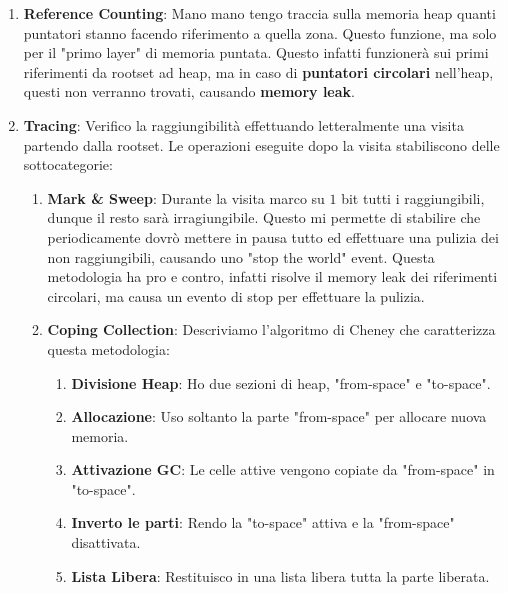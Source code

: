 \documentclass{article}
\begin{document}
\begin{enumerate}
    \item \textbf{Reference Counting}: Mano mano tengo traccia sulla memoria heap quanti puntatori stanno facendo riferimento a quella zona. Questo funzione, ma solo per il "primo layer" di memoria puntata. Questo infatti funzionerà sui primi riferimenti da rootset ad heap, ma in caso di \textbf{puntatori circolari} nell'heap, questi non verranno trovati, causando \textbf{memory leak}.
    \vspace*{10px}
    \item \textbf{Tracing}: Verifico la raggiungibilità effettuando letteralmente una visita partendo dalla rootset. Le operazioni eseguite dopo la visita stabiliscono delle sottocategorie:
    \begin{enumerate}
        \item \textbf{Mark \& Sweep}: Durante la visita marco su $1$ bit tutti i raggiungibili, dunque il resto sarà irragiungibile. Questo mi permette di stabilire che periodicamente dovrò mettere in pausa tutto ed effettuare una pulizia dei non raggiungibili, causando uno "stop the world" event.
        Questa metodologia ha pro e contro, infatti risolve il memory leak dei riferimenti circolari, ma causa un evento di stop per effettuare la pulizia.
        \item \textbf{Coping Collection}: Descriviamo l'algoritmo di Cheney che caratterizza questa metodologia:
        \begin{enumerate}
            \vspace*{8px}
            \item \textbf{Divisione Heap}: Ho due sezioni di heap, "from-space" e "to-space".
            \vspace*{8px}
            \item \textbf{Allocazione}: Uso soltanto la parte "from-space" per allocare nuova memoria.
            \vspace*{8px}
            \item \textbf{Attivazione GC}: Le celle attive vengono copiate da "from-space" in "to-space".
            \vspace*{8px}
            \item \textbf{Inverto le parti}: Rendo la "to-space" attiva e la "from-space" disattivata.
            \vspace*{8px}
            \item \textbf{Lista Libera}: Restituisco in una lista libera tutta la parte liberata.
        \end{enumerate}

\end{enumerate}
\end{enumerate}
\end{document}
